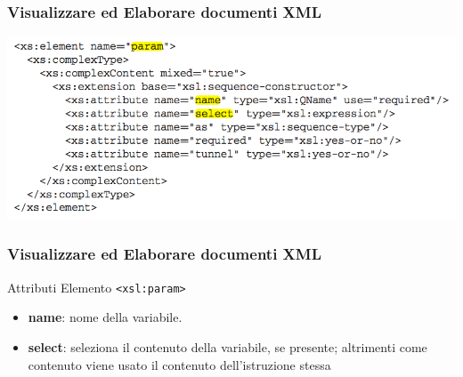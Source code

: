 \begin{frame}
    \frametitle{Visualizzare ed Elaborare documenti XML}
    \addtocounter{nframe}{1}
    
    \begin{center}
        \includegraphics[width=.9\textwidth]{imgs/Schema-param.png}
    \end{center}

\end{frame}

\begin{frame}
    \frametitle{Visualizzare ed Elaborare documenti XML}
    \addtocounter{nframe}{1}
    

     \begin{block}{Attributi Elemento \texttt{<xsl:param>}}
         \begin{itemize}
             \item \textbf{name}: nome della variabile.
             \item \textbf{select}: seleziona il contenuto della variabile, se presente; altrimenti come contenuto viene usato il contenuto dell’istruzione stessa
        \end{itemize}
     \end{block}
    
\end{frame}

